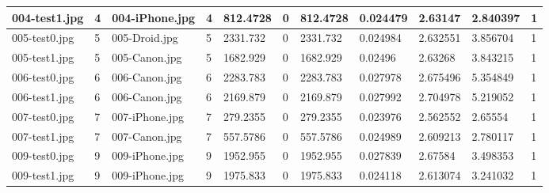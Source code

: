 \begin{landscape}
\begin{longtable}{|p{2cm}|p{1cm}|p{2cm}|p{1cm}|p{2cm}|p{1cm}|p{2cm}|p{2cm}|p{2cm}|p{2cm}|p{1cm}|}
		004-test1.jpg   & 4                & 004-iPhone.jpg        & 4                           & 812.4728              & 0                       & 812.4728                   & 0.024479              & 2.63147               & 2.840397                 & 1                \\ \hline
		005-test0.jpg   & 5                & 005-Droid.jpg         & 5                           & 2331.732              & 0                       & 2331.732                   & 0.024984              & 2.632551              & 3.856704                 & 1                \\ \hline
		005-test1.jpg   & 5                & 005-Canon.jpg         & 5                           & 1682.929              & 0                       & 1682.929                   & 0.02496               & 2.63268               & 3.843215                 & 1                \\ \hline
		006-test0.jpg   & 6                & 006-Canon.jpg         & 6                           & 2283.783              & 0                       & 2283.783                   & 0.027978              & 2.675496              & 5.354849                 & 1                \\ \hline
		006-test1.jpg   & 6                & 006-Canon.jpg         & 6                           & 2169.879              & 0                       & 2169.879                   & 0.027992              & 2.704978              & 5.219052                 & 1                \\ \hline
		007-test0.jpg   & 7                & 007-iPhone.jpg        & 7                           & 279.2355              & 0                       & 279.2355                   & 0.023976              & 2.562552              & 2.65554                  & 1                \\ \hline
		007-test1.jpg   & 7                & 007-Canon.jpg         & 7                           & 557.5786              & 0                       & 557.5786                   & 0.024989              & 2.609213              & 2.780117                 & 1                \\ \hline
		009-test0.jpg   & 9                & 009-iPhone.jpg        & 9                           & 1952.955              & 0                       & 1952.955                   & 0.027839              & 2.67584               & 3.498353                 & 1                \\ \hline
		009-test1.jpg   & 9                & 009-iPhone.jpg        & 9                           & 1975.833              & 0                       & 1975.833                   & 0.024118              & 2.613074              & 3.241032                 & 1                \\ \hline

\end{longtable}
\end{landscape}
